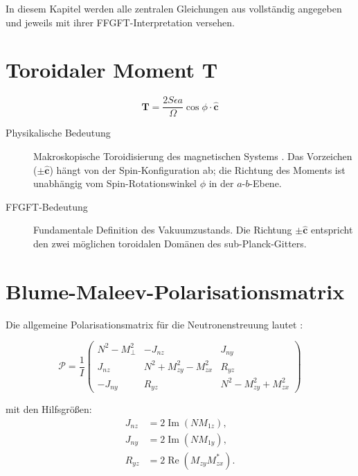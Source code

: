 In diesem Kapitel werden alle zentralen Gleichungen aus \cite{Qureshi2026}
vollständig angegeben und jeweils mit ihrer FFGFT-Interpretation versehen.

\section{Toroidaler Moment \texorpdfstring{$\mathbf{T}$}{T}}

\begin{equation}
  \mathbf{T} = \frac{2S\epsilon a}{\Omega}\cos\phi \cdot \hat{\mathbf{c}}
  \label{eq:toroidal-moment}
\end{equation}

\begin{description}
  \item[Physikalische Bedeutung] Makroskopische Toroidisierung des magnetischen
    Systems \cite[Gl.~1]{Qureshi2026}. Das Vorzeichen ($\pm\hat{\mathbf{c}}$)
    hängt von der Spin-Konfiguration ab; die Richtung des Moments ist
    unabhängig vom Spin-Rotationswinkel $\phi$ in der $a$-$b$-Ebene.
  \item[FFGFT-Bedeutung] Fundamentale Definition des Vakuumzustands.
    Die Richtung $\pm\hat{\mathbf{c}}$ entspricht den zwei möglichen
    toroidalen Domänen des sub-Planck-Gitters.
\end{description}

\section{Blume-Maleev-Polarisationsmatrix}

Die allgemeine Polarisationsmatrix für die Neutronenstreuung lautet
\cite[Gl.~3]{Qureshi2026}:

\begin{equation}
  \mathcal{P} = \frac{1}{I}
  \begin{pmatrix}
    N^2 - M_\perp^2 & -J_{nz} & J_{ny} \\
    J_{nz} & N^2 + M_{zy}^2 - M_{zx}^2 & R_{yz} \\
    -J_{ny} & R_{yz} & N^2 - M_{zy}^2 + M_{zx}^2
  \end{pmatrix}
  \label{eq:polarisation-matrix}
\end{equation}

mit den Hilfsgrößen:
\begin{align}
  J_{nz} &= 2\operatorname{Im}(N M_{1z}), \\
  J_{ny} &= 2\operatorname{Im}(N M_{1y}), \\
  R_{yz} &= 2\operatorname{Re}(M_{zy}M_{zx}^*).
\end{align}

